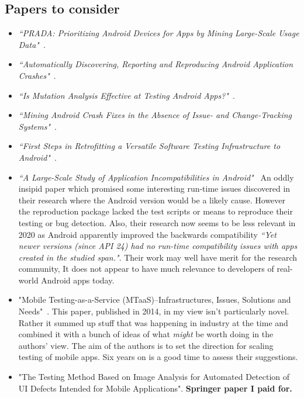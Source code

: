 \subsection{Papers to consider}
\begin{itemize}
    \item \emph{``PRADA: Prioritizing Android Devices for Apps by Mining Large-Scale Usage Data"}~\citep{lu2016_PRADA}. 
        
    \item \emph{``Automatically Discovering, Reporting and Reproducing Android Application Crashes"}~\citep{moran2016_automatically_drr_android_app_crashes}.
    
    \item \emph{``Is Mutation Analysis Effective at Testing Android Apps?"}~\citep{deng2017_is_mutation_analysis_effective_at_testing_android_apps}.
    
    \item \emph{``Mining Android Crash Fixes in the Absence of Issue- and Change-Tracking Systems"}~\citep{kong2019_mining_android_crash_fixes}.
    
    \item \emph{``First Steps in Retrofitting a Versatile Software Testing Infrastructure to Android"}~\citep{oliver2018_first_steps_in_retrofitting_a_versatile_sw_testing_architecture}.
    
    \item \emph{``A Large-Scale Study of Application Incompatibilities in Android"}~\citep{cai2019_large_scale_study_of_android_incompatibilities} An oddly insipid paper which promised some interesting run-time issues discovered in their research where the Android version would be a likely cause. However the reproduction package lacked the test scripts or means to reproduce their testing or bug detection. Also, their research now seems to be less relevant in 2020 as Android apparently improved the backwards compatibility \emph{``Yet newer versions (since API 24) had no run-time compatibility issues with apps created in the studied span."}. Their work may well have merit for the research community, It does not appear to have much relevance to developers of real-world Android apps today.
    
    \item "Mobile Testing-as-a-Service (MTaaS)--Infrastructures, Issues, Solutions and Needs"~\cite{gao2014mobile}. This paper, published in 2014, in my view isn't particularly novel. Rather it summed up stuff that was happening in industry at the time and combined it with a bunch of ideas of what \emph{might} be worth doing in the authors' view. The aim of the authors is to set the direction for scaling testing of mobile apps. Six years on is a good time to assess their suggestions.
    \item "The Testing Method Based on Image Analysis for Automated Detection of UI Defects Intended for Mobile Applications". \textbf{Springer paper I paid for.}
\end{itemize}

